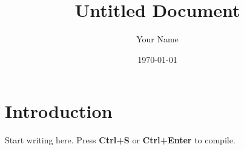 \documentclass[11pt,a4paper]{article}
\title{Untitled Document}
\author{Your Name}
\date{\today}
\begin{document}
\maketitle

\section{Introduction}
Start writing here. Press \textbf{Ctrl+S} or \textbf{Ctrl+Enter} to compile.
\end{document}
